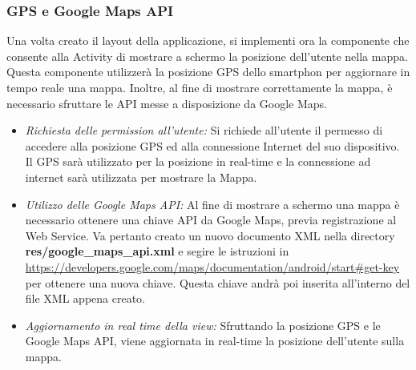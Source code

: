 \subsubsection{GPS e Google Maps API}
Una volta creato il layout della applicazione, si implementi ora la componente che consente alla Activity di mostrare a schermo la posizione dell'utente nella mappa. Questa componente utilizzerà la posizione GPS dello smartphon per aggiornare in tempo reale una mappa. Inoltre, al fine di mostrare correttamente la mappa, è necessario sfruttare le API messe a disposizione da Google Maps.
\begin{itemize}
	\item \textit{Richiesta delle permission all'utente:} Si richiede all'utente il permesso di accedere alla posizione GPS ed alla connessione Internet del suo dispositivo. Il GPS sarà utilizzato per la posizione in real-time e la connessione ad internet sarà utilizzata per mostrare la Mappa.
	
	
	\item \textit{Utilizzo delle Google Maps API:} Al fine di mostrare a schermo una mappa è necessario ottenere una chiave API da Google Maps, previa registrazione al Web Service. Va pertanto creato un nuovo documento XML nella directory \textbf{res/google\_maps\_api.xml} e segire le istruzioni in \url{https://developers.google.com/maps/documentation/android/start#get-key} per ottenere una nuova chiave. Questa chiave andrà poi inserita all'interno del file XML appena creato.
	
		
	\item \textit{Aggiornamento in real time della view:} Sfruttando la posizione GPS e le Google Maps API, viene aggiornata in real-time la posizione dell'utente sulla mappa.
\end{itemize}

